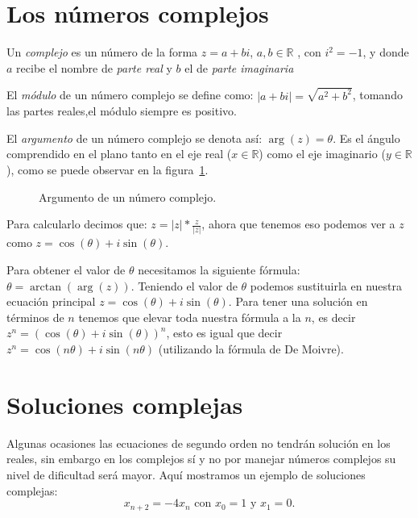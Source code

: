 \documentclass{report}
\theoremstyle{definition}
\begin{document}
\section{Los números  complejos}

Un \textit{complejo} es un número de la forma $z=a+bi$, $a,b\in\mathbb{R}$ ,
con $i^2=-1$, y donde $a$ recibe el nombre de \textit{parte real} y $b$ el de
\textit{parte imaginaria}

El \textit{módulo} de un número complejo se define como:
$|a+bi|=\sqrt{a^2+b^2}$, tomando las partes reales,el módulo
siempre es positivo.

El \textit{argumento} de un número complejo se denota así: $\arg(z)=\theta$. Es
el ángulo comprendido en el plano tanto en el eje real
($x\in\mathbb{R}$) como el eje imaginario ($y\in\mathbb{R}$), como se puede observar en la figura~\ref{argumento}.
\begin{figure}[htp]
\centering
{}
\caption{Argumento de un número complejo.}
\label{argumento}
\end{figure}

Para calcularlo decimos que:
$z=|z|*\frac{z}{|z|}$, ahora que tenemos eso podemos ver a $z$ como
$z=\cos(\theta)+i\sin(\theta)$.

Para obtener el valor de $\theta$
necesitamos la siguiente fórmula: $\theta=\arctan(\arg(z))$. Teniendo el
valor de $\theta$ podemos sustituirla en nuestra ecuación principal
$z=\cos(\theta)+i\sin(\theta)$. Para tener una solución en términos de
$n$ tenemos que elevar toda nuestra fórmula a la $n$, es decir
$z^n=(\cos(\theta)+i\sin(\theta))^n$, esto es igual que decir
$z^n=\cos(n\theta)+i\sin(n\theta)$ (utilizando la fórmula de De Moivre).

\section{Soluciones complejas}
\label{sec:complejas}

Algunas ocasiones las ecuaciones de segundo orden no tendrán solución
en los reales, sin embargo en los complejos sí y no por manejar
números complejos su nivel de dificultad será mayor. Aquí mostramos un
ejemplo de soluciones complejas:
\begin{equation}
  \label{eq:20}
  x_{n+2}=-4x_{n} \text{ con }  x_0=1 \text{ y } x_1=0.
\end{equation}
\end{document}
